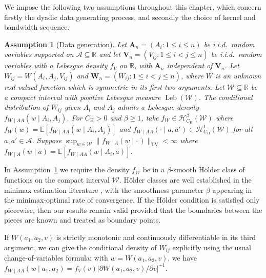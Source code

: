 \documentclass[11pt,lof]{puthesis}
\newcommand{\R}{\ensuremath{\mathbb{R}}}
\newcommand{\E}{\ensuremath{\mathbb{E}}}
\newcommand{\rH}{\ensuremath{\mathrm{H}}}
\newcommand{\TV}{\mathrm{TV}}
\newcommand{\bW}{\ensuremath{\mathbf{W}}}
\newcommand{\bA}{\ensuremath{\mathbf{A}}}
\newcommand{\bV}{\ensuremath{\mathbf{V}}}
\newcommand{\cH}{\ensuremath{\mathcal{H}}}
\newcommand{\cW}{\ensuremath{\mathcal{W}}}
\newcommand{\cA}{\ensuremath{\mathcal{A}}}
\DeclareMathOperator{\Leb}{Leb}
\theoremstyle{break}
\newtheorem{assumption}{Assumption}[section]
\theoremstyle{proof}
\begin{document}
We impose the following two assumptions throughout this chapter,
which concern firstly the dyadic data generating process, and
secondly the choice of kernel and bandwidth sequence.

%
\begin{assumption}[Data generation]
\label{ass:kernel_data}
%
Let $\bA_n = (A_i: 1 \leq i \leq n)$ be i.i.d.\ random variables supported on
$\cA \subseteq \R$ and let $\bV_n = (V_{i j}: 1 \leq i < j \leq n)$ be
i.i.d.\ random variables with a Lebesgue density $f_V$ on $\R$, with $\bA_n$
independent of $\bV_n$.
%
Let $W_{i j} = W(A_i, A_j, V_{i j})$ and
$\bW_n = (W_{i j}: 1 \leq i < j \leq n)$, where $W$ is an unknown real-valued
function which is symmetric in its first two arguments.
%
Let $\cW \subseteq \R$ be a compact interval with positive Lebesgue measure
$\Leb(\cW)$. The conditional distribution of $W_{i j}$ given $A_i$ and $A_j$
admits a Lebesgue density $f_{W \mid AA}(w \mid A_i, A_j)$.
For $C_\rH > 0$ and $\beta \geq 1$, take $f_W \in \cH^\beta_{C_\rH}(\cW)$
where $f_{W}(w) = \E\left[f_{W \mid AA}(w \mid A_i,A_j)\right]$ and
$f_{W \mid AA}(\cdot \mid a, a') \in \cH^1_{C_\rH}(\cW)$
for all $a,a' \in \cA$. Suppose
$\sup_{w \in \cW} \|f_{W \mid A}(w \mid \cdot\,)\|_\TV <\infty$ where
$f_{W \mid A}(w \mid a) = \E\left[f_{W \mid AA}(w \mid A_i,a)\right]$.
%
\end{assumption}

In Assumption~\ref{ass:kernel_data} we require the density $f_W$ be in a
$\beta$-smooth H\"older class of functions on the compact interval $\cW$.
H\"older classes are well established in the minimax estimation literature
\citep{stone1982optimal,gine2021mathematical},
with the smoothness parameter $\beta$ appearing
in the minimax-optimal rate of convergence. If the H\"older condition is
satisfied only piecewise, then our results remain valid provided that the
boundaries between the pieces are known and treated as boundary points.

If $W(a_1, a_2, v)$ is strictly monotonic and continuously differentiable in
its third argument, we can give the conditional density of $W_{i j}$ explicitly
using the usual change-of-variables formula: with $w=W(a_1,a_2,v)$, we have
$f_{W \mid AA}(w \mid a_1,a_2)
= f_V(v) \big|\partial W(a_1,a_2,v)/\partial v\big|^{-1}$.
\end{document}
